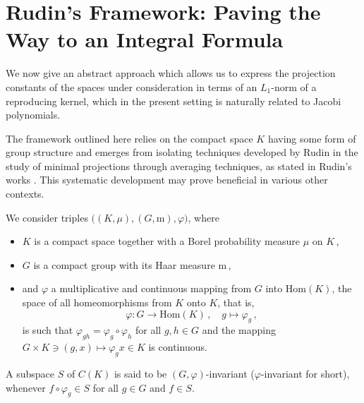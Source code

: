 \documentclass[12pt]{amsart}
\numberwithin{subsection}{section}
\theoremstyle{definition}
\theoremstyle{remark}
\begin{document}





\section{Rudin's Framework: Paving the Way to an Integral Formula} \label{la Rudin} 

We now give an abstract approach  which allows us to express
the projection constants of the spaces under consideration in terms of an $L_1$-norm of a
reproducing kernel, which in the present setting is naturally related to Jacobi polynomials.


The framework outlined here relies on the compact space $K$ having some form of group structure and emerges from isolating techniques developed by Rudin in the study of minimal projections through averaging techniques, as stated in Rudin's works \cite{rudin1962projections, rudin1986new}.  This systematic development may prove beneficial in various other contexts.

We consider  triples  $\big((K,\mu),(G,\mathrm{m}),\varphi\big)$, where
\begin{itemize}
  \item
  $K$ is a compact space together with a Borel probability measure $\mu$ on $K$\,,
  \item
  $G$ is a compact  group with  its Haar measure  $\mathrm{m}$\,,
  \item
  and  $\varphi$ a multiplicative and continuous mapping from $G$ into
  $\text{Hom}(K)$, the space  of all  homeomorphisms from $K$ onto $K$, that is,
  \[
\varphi: G \longrightarrow \text{Hom}(K)\,, \quad g \mapsto \varphi_g\,,
\]
is such that    $\varphi_{gh} = \varphi_g \circ \varphi_h$ for all $g,h\in G $ and   the mapping  $G \times K \ni (g, x) \mapsto \varphi_gx \in K$ is continuous.

\end{itemize}
A subspace $S$ of $C(K)$ is said to be $(G,\varphi)$-invariant
($\varphi$-invariant for short), whenever $ f \circ \varphi_g \in S $ for all $g \in G$ and $f \in S$. 
\end{document}

